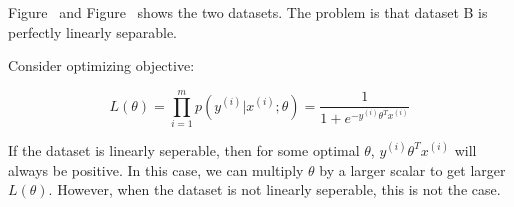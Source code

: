\begin{answer}
Figure~ and Figure~ shows the two datasets. The problem is that dataset B is perfectly linearly separable. 

Consider optimizing objective:

$$
    L(\theta) = \prod_{i=1}^mp(y^{(i)}|x^{(i)};\theta) = \frac{1}{1 + e^{-y^{(i)}\theta^T x^{(i)}}}
$$

    If the dataset is linearly seperable, then for some optimal $\theta$, $y^{(i)}\theta^T x^{(i)}$ will always be positive. In this case, we can multiply $\theta$ by a larger scalar to get larger $L(\theta)$. However, when the dataset is not linearly seperable, this is not the case.


\end{answer}


